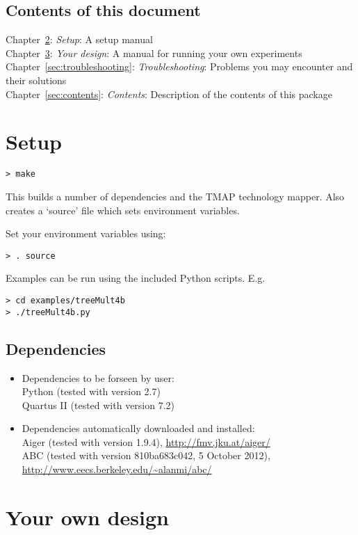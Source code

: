\documentclass[a4paper]{memoir}
\begin{document}
\section{Contents of this document}
Chapter~\ref{sec:setup}: \emph{Setup}: A setup manual\\
Chapter~\ref{sec:experiment}: \emph{Your design}: A manual for running your own experiments\\
Chapter~\ref{sec:troubleshooting}: \emph{Troubleshooting}: Problems you may encounter and their solutions\\
Chapter~\ref{sec:contents}: \emph{Contents}: Description of the contents of this package


\clearpage
\chapter{Setup}\label{sec:setup}
\begin{lstlisting}
> make
\end{lstlisting}
This builds a number of dependencies and the TMAP technology mapper.
Also creates a `source' file which sets environment variables.

Set your environment variables using:
\begin{lstlisting}
> . source
\end{lstlisting}
Examples can be run using the included Python scripts.
E.g.
\begin{lstlisting}
> cd examples/treeMult4b
> ./treeMult4b.py
\end{lstlisting}

\section{Dependencies}
\begin{itemize}
\item Dependencies to be forseen by user:\\
Python (tested with version 2.7)\\
Quartus II (tested with version 7.2)
\item Dependencies automatically downloaded and installed:\\
Aiger (tested with version 1.9.4), \url{http://fmv.jku.at/aiger/}\\
ABC (tested with version 810ba683c042, 5 October 2012), \url{http://www.eecs.berkeley.edu/\~alanmi/abc/}
\end{itemize}


\chapter{Your own design}\label{sec:experiment}
\end{document}
